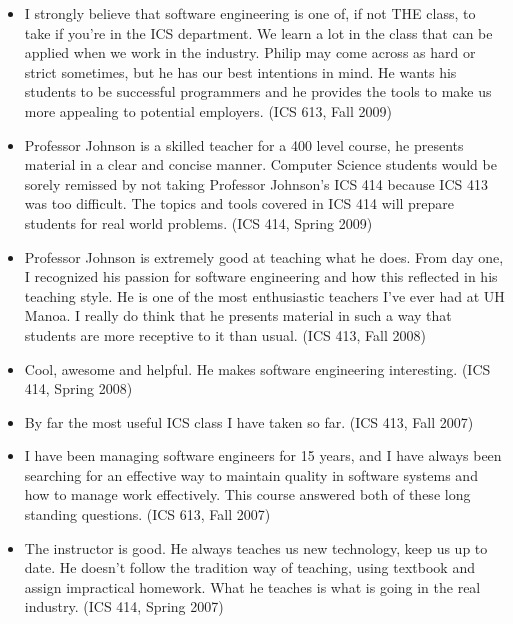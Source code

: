 \documentclass[11pt]{article}
\begin{document}
\begin{itemize}

\item I strongly believe that software engineering is one of, if not THE
  class, to take if you're in the ICS department. We learn a lot in the
  class that can be applied when we work in the industry. Philip may come
  across as hard or strict sometimes, but he has our best intentions in
  mind. He wants his students to be successful programmers and he provides
  the tools to make us more appealing to potential employers. (ICS 613,
  Fall 2009)

\item Professor Johnson is a skilled teacher for a 400 level course, he
  presents material in a clear and concise manner. Computer Science
  students would be sorely remissed by not taking Professor Johnson's ICS
  414 because ICS 413 was too difficult. The topics and tools covered in
  ICS 414 will prepare students for real world problems. (ICS 414, Spring
  2009)

\item Professor Johnson is extremely good at teaching what he does. From day one, I recognized his passion for software engineering and how this reflected in his teaching style. He is one of the most enthusiastic teachers I've ever had at UH Manoa. I really do think that he presents material in such a way that students are more receptive to it than usual. (ICS 413, Fall 2008)

\item Cool, awesome and helpful. He makes software engineering
  interesting. (ICS 414, Spring 2008)

\item  By far the most useful ICS class I have taken so far.  (ICS 413, Fall
  2007)

\item I have been managing software engineers for 15 years, and I have always been searching for an effective way to maintain quality in software systems and how to manage work effectively. This course answered both of these long standing questions. (ICS 613, Fall 2007)

\item The instructor is good. He always teaches us new technology, keep us
  up to date. He doesn't follow the tradition way of teaching, using
  textbook and assign impractical homework. What he teaches is what is
  going in the real industry. (ICS 414, Spring 2007)

\end{itemize}
\end{document}
